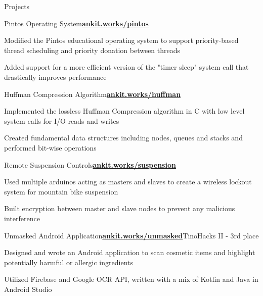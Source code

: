 \documentclass{resume}
\begin{document}
\begin{rSection}{\large Projects} 

\begin{rSubsection}{Pintos Operating System}{\href{http://ankitsachdeva.com/pintos/}{\bf{{ankit.works/pintos}}}}{}{}
\item Modified the Pintos educational operating system to support priority-based thread scheduling and priority donation between threads   
\item Added support for a more efficient version of the "timer sleep" system call that drastically improves performance 
\end{rSubsection}
 
\begin{rSubsection}{Huffman Compression Algorithm}{\href{https://ankitsachdeva.com/huffman/}{\bf{{ankit.works/huffman}}}}{}{}
\item Implemented the lossless Huffman Compression algorithm in C with low level system calls for I/O reads and writes
\item Created fundamental data structures including nodes, queues and stacks and performed bit-wise operations
\end{rSubsection}

\begin{rSubsection}{Remote Suspension Controls}{\href{https://ankitsachdeva.com/suspension}{{\bf{ankit.works/suspension}}}}{}{}
\item Used multiple arduinos acting as masters and slaves to create a wireless lockout system for mountain bike suspension
\item Built encryption between master and slave nodes to prevent any malicious interference
\end{rSubsection}

\begin{rSubsection}{Unmasked Android Application}{\href{https://ankitsachdeva.com/unmasked}{\bf{{ankit.works/unmasked}}}}{TinoHacks II - 3rd place}{}
\item Designed and wrote an Android application to scan cosmetic items and highlight potentially harmful or allergic ingredients
\item Utilized Firebase and Google OCR API, written with a mix of Kotlin and Java in Android Studio
\end{rSubsection}

\end{rSection}
\end{document}
